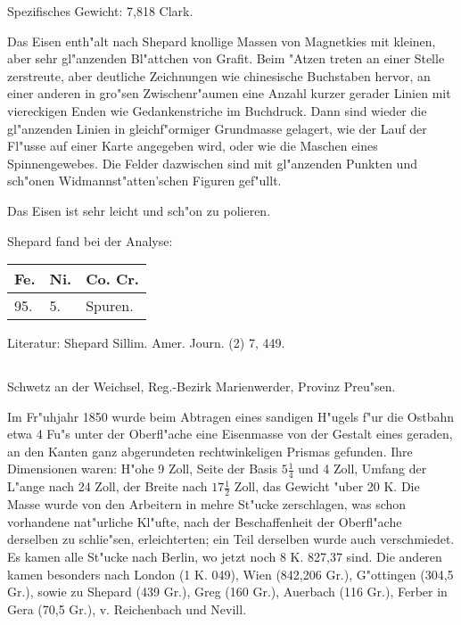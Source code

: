 \documentclass[a4paper, 11pt, oneside]{article}
\begin{document}
Spezifisches Gewicht: 7,818 Clark.

Das Eisen enth"alt nach Shepard knollige Massen von Magnetkies mit kleinen, aber sehr gl"anzenden Bl"attchen von Grafit. Beim "Atzen treten an einer Stelle zerstreute, aber deutliche Zeichnungen wie chinesische Buchstaben hervor, an einer anderen in gro"sen Zwischenr"aumen eine Anzahl kurzer gerader Linien mit viereckigen Enden wie Gedankenstriche im Buchdruck. Dann sind wieder die gl"anzenden Linien in gleichf"ormiger Grundmasse gelagert, wie der Lauf der Fl"usse auf einer Karte angegeben wird, oder wie die Maschen eines Spinnengewebes. Die Felder dazwischen sind mit gl"anzenden Punkten und sch"onen Widmannst"atten'schen Figuren gef"ullt.

Das Eisen ist sehr leicht und sch"on zu polieren.

Shepard fand bei der Analyse:
\begin{table}[H]
    \centering\swabfamily\Large
    \begin{tabular}{l l l}
        Fe. & Ni. & Co. Cr. \\ \hline
        95. & 5. & Spuren. \\
    \end{tabular}
\end{table}

\normalsize
Literatur: Shepard Sillim. Amer. Journ. (2) 7, 449.

\subsection{}
\LARGE
\paragraph{}
Schwetz an der Weichsel, Reg.-Bezirk Marienwerder, Provinz Preu"sen.

Im Fr"uhjahr 1850 wurde beim Abtragen eines sandigen H"ugels f"ur die Ostbahn etwa 4 Fu"s unter der Oberfl"ache eine Eisenmasse von der Gestalt eines geraden, an den Kanten ganz abgerundeten rechtwinkeligen Prismas gefunden. Ihre Dimensionen waren: H"ohe 9 Zoll, Seite der Basis $\mathfrak{5\frac{1}{4}}$ und 4 Zoll, Umfang der L"ange nach 24 Zoll, der Breite nach $\mathfrak{17\frac{1}{2}}$ Zoll, das Gewicht "uber 20 K. Die Masse wurde von den Arbeitern in mehre St"ucke zerschlagen, was schon vorhandene nat"urliche Kl"ufte, nach der Beschaffenheit der Oberfl"ache derselben zu schlie"sen, erleichterten; ein Teil derselben wurde auch verschmiedet. Es kamen alle St"ucke nach Berlin, wo jetzt noch 8 K. 827,37 sind. Die anderen kamen besonders nach London (1 K. 049), Wien (842,206 Gr.), G"ottingen (304,5 Gr.), sowie zu Shepard (439 Gr.), Greg (160 Gr.), Auerbach (116 Gr.), Ferber in Gera (70,5 Gr.), v. Reichenbach und Nevill.
\end{document}
